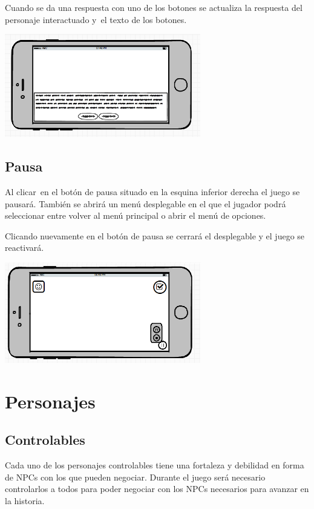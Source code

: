 {
Cuando se da una respuesta con uno de los botones se actualiza la respuesta del personaje interactuado y\ el texto de
los botones.\ \ }

 \includegraphics[width=3.36728in,height=1.77154in]{anexos/GDD/GDD-img008.png} 

\subsection[Pausa]{ Pausa}
\hypertarget{Toc484614223}{}{
Al clicar\ en el bot\'on de pausa situado en la esquina inferior derecha el juego se pausar\'a. Tambi\'en se abrir\'a un
men\'u desplegable en el que el jugador podr\'a seleccionar entre volver al men\'u principal o abrir el men\'u de
opciones.}

{
Clicando nuevamente en el bot\'on de pausa se cerrar\'a el desplegable y el juego se reactivar\'a.}

 \includegraphics[width=3.36029in,height=1.72756in]{anexos/GDD/GDD-img009.png} 

\section[Personajes]{ Personajes}
\hypertarget{Toc484614224}{}\subsection[Controlables]{ Controlables}
\hypertarget{Toc484614225}{}{
Cada uno de los personajes controlables tiene una fortaleza y debilidad en forma de NPCs con los que pueden negociar.
Durante el juego ser\'a necesario controlarlos a todos para poder negociar con los NPCs necesarios para avanzar en la
historia.}

